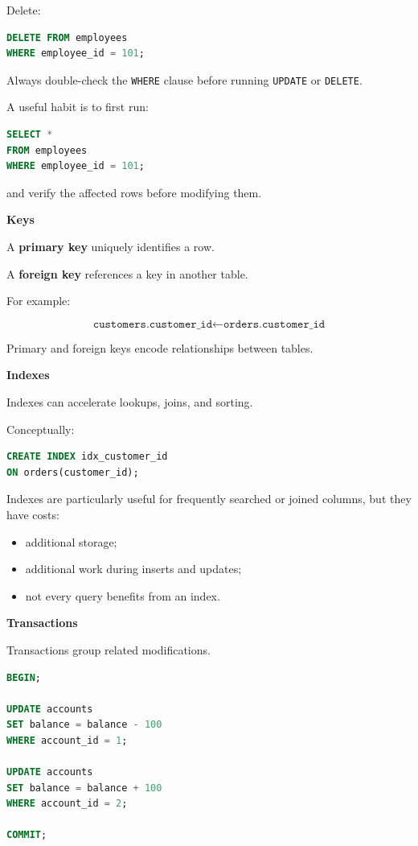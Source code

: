 \documentclass[11pt,letterpaper]{article}
\begin{document}
Delete:

\begin{lstlisting}[language=SQL]
DELETE FROM employees
WHERE employee_id = 101;
\end{lstlisting}

Always double-check the \texttt{WHERE} clause before running
\texttt{UPDATE} or \texttt{DELETE}.

A useful habit is to first run:

\begin{lstlisting}[language=SQL]
SELECT *
FROM employees
WHERE employee_id = 101;
\end{lstlisting}

and verify the affected rows before modifying them.

\textbf{Keys}

A \textbf{primary key} uniquely identifies a row.

A \textbf{foreign key} references a key in another table.

For example:

\[
\texttt{customers.customer\_id}
\longleftarrow
\texttt{orders.customer\_id}
\]

Primary and foreign keys encode relationships between tables.

\textbf{Indexes}

Indexes can accelerate lookups, joins, and sorting.

Conceptually:

\begin{lstlisting}[language=SQL]
CREATE INDEX idx_customer_id
ON orders(customer_id);
\end{lstlisting}

Indexes are particularly useful for frequently searched or joined columns, but
they have costs:

\begin{itemize}[leftmargin=*]
    \item additional storage;
    \item additional work during inserts and updates;
    \item not every query benefits from an index.
\end{itemize}

\textbf{Transactions}

Transactions group related modifications.

\begin{lstlisting}[language=SQL]
BEGIN;

UPDATE accounts
SET balance = balance - 100
WHERE account_id = 1;

UPDATE accounts
SET balance = balance + 100
WHERE account_id = 2;

COMMIT;
\end{lstlisting}
\end{document}
